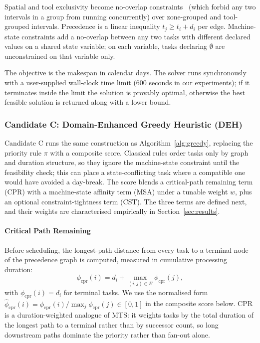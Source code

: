 \documentclass[conference]{IEEEtran}
\begin{document}
Spatial and tool exclusivity become no-overlap
constraints~\cite{laborie2008complete} (which forbid any two
intervals in a group from running concurrently) over zone-grouped
and tool-grouped intervals. Precedence is a linear inequality $t_j
\geq t_i + d_i$ per edge. Machine-state constraints add a
no-overlap between any two tasks with different declared values on a
shared state variable; on each variable, tasks declaring $\emptyset$
are unconstrained on that variable only.

The objective is the makespan in calendar days. The solver runs
synchronously with a user-supplied wall-clock time limit (600 seconds
in our experiments); if it terminates inside the limit the solution
is provably optimal, otherwise the best feasible solution is returned
along with a lower bound.

\subsubsection{Candidate C: Domain-Enhanced Greedy Heuristic (DEH)}

Candidate C runs the same construction as Algorithm~\ref{alg:greedy},
replacing the priority rule $\pi$ with a composite score. Classical
rules order tasks only by graph and duration structure, so they ignore
the machine-state constraint until the feasibility check; this can
place a state-conflicting task where a compatible one would have
avoided a day-break. The score blends a critical-path remaining term
(CPR) with a machine-state affinity term (MSA) under a tunable weight
$w$, plus an optional constraint-tightness term (CST). The three terms
are defined next, and their weights are characterised empirically in
Section~\ref{sec:results}.

\paragraph{Critical Path Remaining}
Before scheduling, the longest-path distance from every task to a
terminal node of the precedence graph is computed, measured in
cumulative processing duration:
\begin{equation}
\phi_{\text{cpr}}(i) = d_i + \max_{(i,j) \in E} \phi_{\text{cpr}}(j),
\end{equation}
with $\phi_{\text{cpr}}(i) = d_i$ for terminal tasks. We use the
normalised form $\hat{\phi}_{\text{cpr}}(i) = \phi_{\text{cpr}}(i) /
\max_j \phi_{\text{cpr}}(j) \in [0,1]$ in the composite score below.
CPR is a duration-weighted analogue of MTS: it weights tasks by the
total duration of the longest path to a terminal rather than by
successor count, so long downstream paths dominate the priority
rather than fan-out alone.
\end{document}
